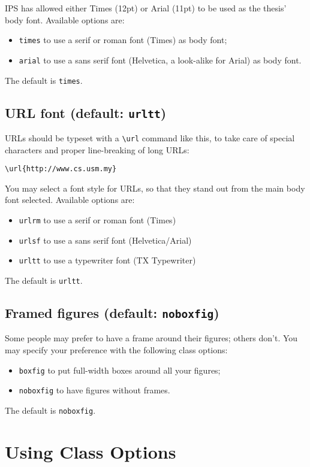 IPS has allowed either Times (12pt) or Arial (11pt) to be used as the thesis' body font. Available options are:

\begin{itemize}
\item \texttt{times} to use a serif or roman font (Times) as body font;
\item \texttt{arial} to use a sans serif font (Helvetica, a look-alike for Arial) as body font.
\end{itemize}

The default is \texttt{times}.


\subsection{URL font (default: \texttt{urltt})}

URLs should be typeset with a \verb|\url| command like this, to take care of special characters and proper line-breaking of long URLs:

   \lstinline|\url{http://www.cs.usm.my}|
   
You may select a font style for URLs, so that they stand out from the main body font selected. Available options are:
\begin{itemize}[nosep]
\item \texttt{urlrm} to use a serif or roman font (Times)
\item \texttt{urlsf} to use a sans serif font (Helvetica/Arial)
\item \texttt{urltt} to use a typewriter font (TX Typewriter)
\end{itemize}
The default is \texttt{urltt}.


\subsection{Framed figures (default: \texttt{noboxfig})}
Some people may prefer to have a frame around their figures; others don't. You may specify your preference with the following class options:
%
\begin{itemize}[nosep]
\item \texttt{boxfig} to put full-width boxes around all your figures;
\item \texttt{noboxfig} to have figures without frames.
\end{itemize}
%
The default is \texttt{noboxfig}.


\section{Using Class Options}


